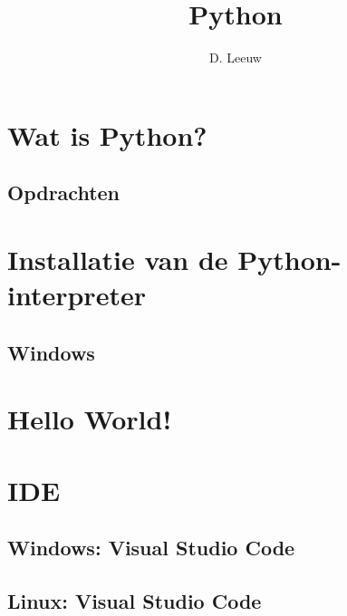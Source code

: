 \documentclass[a4paper,12pt,twoside,titlepage]{article}
\author{D. Leeuw}
\title{Python}
\date{\today\\
0.0.0
\vfill
\raggedright
\copyright\ 2025 Dennis Leeuw\\
}
\begin{document}

\maketitle



\section{Wat is Python?}

\subsection{Opdrachten}


\section{Installatie van de Python-interpreter}
\subsection{Windows}


\section{Hello World!}


\section{IDE}

\subsection{Windows: Visual Studio Code}

\subsection{Linux: Visual Studio Code}

%

\printindex
\end{document}
